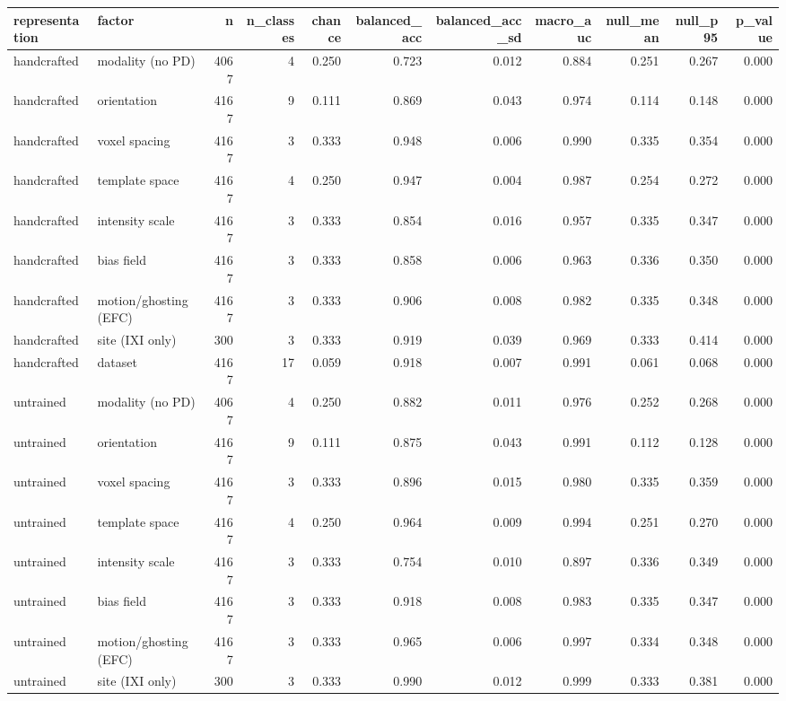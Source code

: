 \begin{tabular}{llrrrrrrrrr}
\toprule
representation & factor & n & n\_classes & chance & balanced\_acc & balanced\_acc\_sd & macro\_auc & null\_mean & null\_p95 & p\_value \\
\midrule
handcrafted & modality (no PD) & 4067 & 4 & 0.250 & 0.723 & 0.012 & 0.884 & 0.251 & 0.267 & 0.000 \\
handcrafted & orientation & 4167 & 9 & 0.111 & 0.869 & 0.043 & 0.974 & 0.114 & 0.148 & 0.000 \\
handcrafted & voxel spacing & 4167 & 3 & 0.333 & 0.948 & 0.006 & 0.990 & 0.335 & 0.354 & 0.000 \\
handcrafted & template space & 4167 & 4 & 0.250 & 0.947 & 0.004 & 0.987 & 0.254 & 0.272 & 0.000 \\
handcrafted & intensity scale & 4167 & 3 & 0.333 & 0.854 & 0.016 & 0.957 & 0.335 & 0.347 & 0.000 \\
handcrafted & bias field & 4167 & 3 & 0.333 & 0.858 & 0.006 & 0.963 & 0.336 & 0.350 & 0.000 \\
handcrafted & motion/ghosting (EFC) & 4167 & 3 & 0.333 & 0.906 & 0.008 & 0.982 & 0.335 & 0.348 & 0.000 \\
handcrafted & site (IXI only) & 300 & 3 & 0.333 & 0.919 & 0.039 & 0.969 & 0.333 & 0.414 & 0.000 \\
handcrafted & dataset & 4167 & 17 & 0.059 & 0.918 & 0.007 & 0.991 & 0.061 & 0.068 & 0.000 \\
untrained & modality (no PD) & 4067 & 4 & 0.250 & 0.882 & 0.011 & 0.976 & 0.252 & 0.268 & 0.000 \\
untrained & orientation & 4167 & 9 & 0.111 & 0.875 & 0.043 & 0.991 & 0.112 & 0.128 & 0.000 \\
untrained & voxel spacing & 4167 & 3 & 0.333 & 0.896 & 0.015 & 0.980 & 0.335 & 0.359 & 0.000 \\
untrained & template space & 4167 & 4 & 0.250 & 0.964 & 0.009 & 0.994 & 0.251 & 0.270 & 0.000 \\
untrained & intensity scale & 4167 & 3 & 0.333 & 0.754 & 0.010 & 0.897 & 0.336 & 0.349 & 0.000 \\
untrained & bias field & 4167 & 3 & 0.333 & 0.918 & 0.008 & 0.983 & 0.335 & 0.347 & 0.000 \\
untrained & motion/ghosting (EFC) & 4167 & 3 & 0.333 & 0.965 & 0.006 & 0.997 & 0.334 & 0.348 & 0.000 \\
untrained & site (IXI only) & 300 & 3 & 0.333 & 0.990 & 0.012 & 0.999 & 0.333 & 0.381 & 0.000 \\

\end{tabular}
